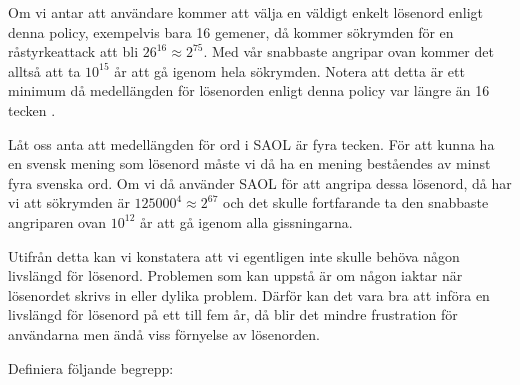 \documentclass[a4paper,addpoints]{miunexam}
\begin{document}
\begin{questions}
\begin{parts}
\begin{solution}
      Om vi antar att användare kommer att välja en väldigt enkelt lösenord 
      enligt denna policy, exempelvis bara 16 gemener, då kommer sökrymden för 
      en råstyrkeattack att bli \( 26^{16}\approx 2^{75} \).
      Med vår snabbaste angripar ovan kommer det alltså att ta \( 10^{15} \) år 
      att gå igenom hela sökrymden.
      Notera att detta är ett minimum då medellängden för lösenorden enligt 
      denna policy var längre än 16 tecken \cite{Komanduri2011opa}.

      Låt oss anta att medellängden för ord i SAOL \cite{SAOL} är fyra tecken.
      För att kunna ha en svensk mening som lösenord måste vi då ha en mening 
      beståendes av minst fyra svenska ord.
      Om vi då använder SAOL för att angripa dessa lösenord, då har vi att 
      sökrymden är \( 125000^4\approx 2^{67} \) och det skulle fortfarande ta 
      den snabbaste angriparen ovan \( 10^{12} \) år att gå igenom alla 
      gissningarna.

      Utifrån detta kan vi konstatera att vi egentligen inte skulle behöva 
      någon livslängd för lösenord.
      Problemen som kan uppstå är om någon iaktar när lösenordet skrivs in 
      eller dylika problem.
      Därför kan det vara bra att införa en livslängd för lösenord på ett till 
      fem år, då blir det mindre frustration för användarna men ändå viss 
      förnyelse av lösenorden.
    \end{solution}
  \end{parts}

  \question\label{q:terminologi}
  Definiera följande begrepp:
\end{questions}
\end{document}
